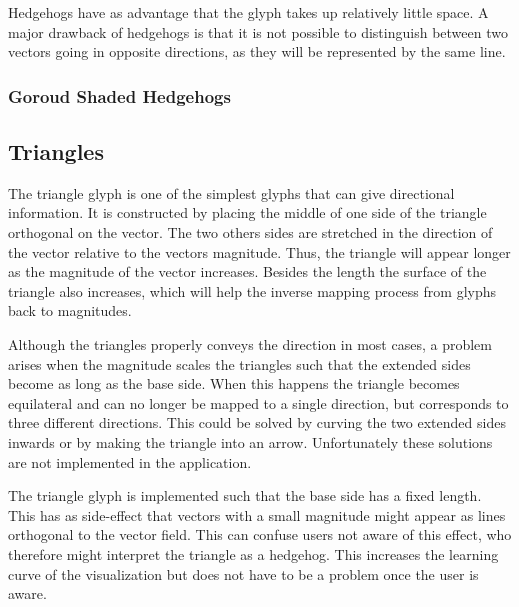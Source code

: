 Hedgehogs have as advantage that the glyph takes up relatively little space. A major drawback of hedgehogs is that it is not possible to distinguish between two vectors going in opposite directions, as they will be represented by the same line. 



\subsubsection{Goroud Shaded Hedgehogs} %
\label{sub:goroud_shaded_hedgehogs}


\subsection{Triangles} %
\label{sub:triangles}
The triangle glyph is one of the simplest glyphs that can give directional information. It is constructed by placing the middle of one side of the triangle orthogonal on the vector. The two others sides are stretched in the direction of the vector relative to the vectors magnitude. Thus, the triangle will appear longer as the magnitude of the vector increases. Besides the length the surface of the triangle also increases, which will help the inverse mapping process from glyphs back to magnitudes.

Although the triangles properly conveys the direction in most cases, a problem arises when the magnitude scales the triangles such that the extended sides become as long as the base side.  When this happens the triangle becomes equilateral and can no longer be mapped to a single direction, but corresponds to three different directions. This could be solved by curving the two extended sides inwards or by making the triangle into an arrow. Unfortunately these solutions are not implemented in the application. 

The triangle glyph is implemented such that the base side has a fixed length. This has as side-effect that vectors with a small magnitude might appear as lines orthogonal to the vector field. This can confuse users not aware of this effect, who therefore might interpret the triangle as a hedgehog. This increases the learning curve of the visualization but does not have to be a problem once the user is aware.


